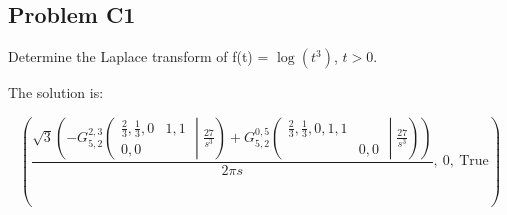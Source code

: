 \subsection*{Problem C1} Determine the Laplace transform of f(t) = \(\log{\left(t^{3} \right)}\), \(t > 0\).

    \medskip
    The solution is:
    
    \smallskip
     \begin{equation}
         \left( \frac{\sqrt{3} \left(- {G_{5, 2}^{2, 3}\left(\begin{matrix} \frac{2}{3}, \frac{1}{3}, 0 & 1, 1 \\0, 0 &  \end{matrix} \middle| {\frac{27}{s^{3}}} \right)} + {G_{5, 2}^{0, 5}\left(\begin{matrix} \frac{2}{3}, \frac{1}{3}, 0, 1, 1 &  \\ & 0, 0 \end{matrix} \middle| {\frac{27}{s^{3}}} \right)}\right)}{2 \pi s}, \  0, \  \text{True}\right)
     \end{equation}
 